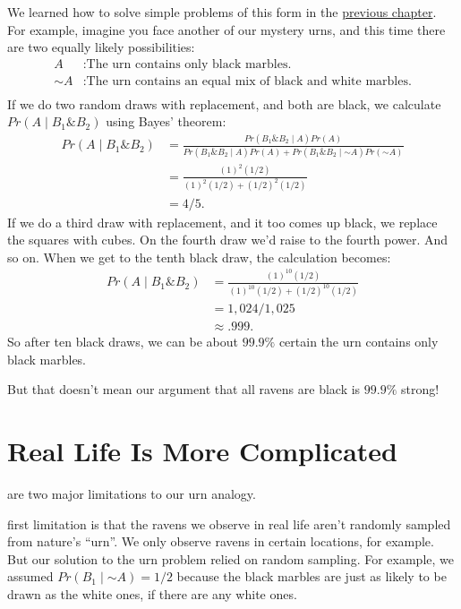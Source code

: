 \documentclass[justified]{tufte-book}
\newcommand{\given}{\mid}
\renewcommand{\neg}{\mathbin{\sim}}
\renewcommand{\wedge}{\mathbin{\&}}
\newcommand{\p}{Pr}
\theoremstyle{definition}
\theoremstyle{definition}
\theoremstyle{definition}
\theoremstyle{remark}
\begin{document}
We learned how to solve simple problems of this form in the
\protect\hyperlink{multiple-draws}{previous chapter}. For example,
imagine you face another of our mystery urns, and this time there are
two equally likely possibilities: \[
  \begin{aligned}
    A      &: \mbox{The urn contains only black marbles.} \\
    \neg A &: \mbox{The urn contains an equal mix of black and white marbles.} \\
  \end{aligned}
\] If we do two random draws with replacement, and both are black, we
calculate \(\p(A \given B_1 \wedge B_2)\) using Bayes' theorem: \[
  \begin{aligned}
    \p(A \given B_1 \wedge B_2) &= \frac{\p(B_1 \wedge B_2 \given A)\p(A)}{\p(B_1 \wedge B_2 \given A) \p(A) + \p(B_1 \wedge B_2 \given \neg A) \p(\neg A)} \\ 
    &= \frac{(1)^2(1/2)}{(1)^2(1/2) + (1/2)^2(1/2)}\\
    &= 4/5.
  \end{aligned}
\] If we do a third draw with replacement, and it too comes up black, we
replace the squares with cubes. On the fourth draw we'd raise to the
fourth power. And so on. When we get to the tenth black draw, the
calculation becomes: \[
  \begin{aligned}
    \p(A \given B_1 \wedge B_2) &= \frac{(1)^{10}(1/2)}{(1)^{10}(1/2) + (1/2)^{10}(1/2)}\\
    &= 1,024/1,025\\
    &\approx .999.
  \end{aligned}
\] So after ten black draws, we can be about \(99.9\%\) certain the urn
contains only black marbles.

But that doesn't mean our argument that all ravens are black is
\(99.9\%\) strong!

\hypertarget{real-life-is-more-complicated}{%
\section{Real Life Is More
Complicated}\label{real-life-is-more-complicated}}

 are two major limitations to our urn analogy.

 first limitation is that the ravens we observe in real
life aren't randomly sampled from nature's ``urn''. We only observe
ravens in certain locations, for example. But our solution to the urn
problem relied on random sampling. For example, we assumed
\(\p(B_1 \given \neg A) = 1/2\) because the black marbles are just as
likely to be drawn as the white ones, if there are any white ones.
\end{document}
